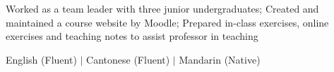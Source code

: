 \documentclass[8pt,a4paper,ragged2e,withhyper]{altacv}
\begin{document}
Worked as a team leader with three junior undergraduates; Created and maintained a course website by Moodle; Prepared in-class exercises, online exercises and teaching notes to assist professor in teaching


  




English (Fluent) $\vert$ Cantonese (Fluent) $\vert$ Mandarin (Native) 
\iffalse



\fi







\end{document}
